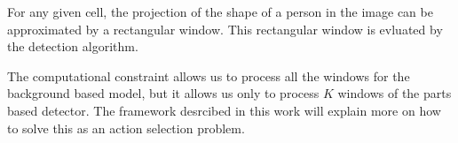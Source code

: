\documentclass[10pt,twocolumn,letterpaper]{article}
\begin{document}
For any given cell, the projection of the shape of a person in the image can be approximated by a rectangular window. This rectangular window is evluated by the detection algorithm. 

The computational constraint allows us to process all the windows for the background based model, but it allows us only to process $ K $ windows of the parts based detector. The framework desrcibed in this work will explain more on how to solve this as an action selection problem.




\end{document}
